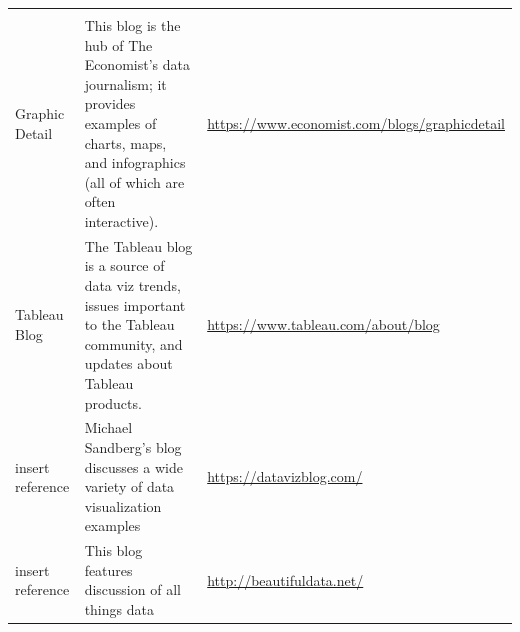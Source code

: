 \documentclass[]{book}
\begin{document}
\begin{longtable}[]{@{}lll@{}}
\begin{minipage}[t]{0.24\columnwidth}
\end{minipage}\tabularnewline
\begin{minipage}[t]{0.24\columnwidth}\raggedright
Graphic Detail\strut
\end{minipage} & \begin{minipage}[t]{0.44\columnwidth}\raggedright
This blog is the hub of The Economist's data journalism; it provides examples of charts, maps, and infographics (all of which are often interactive).\strut
\end{minipage} & \begin{minipage}[t]{0.24\columnwidth}\raggedright
\url{https://www.economist.com/blogs/graphicdetail}\strut
\end{minipage}\tabularnewline
\begin{minipage}[t]{0.24\columnwidth}\raggedright
Tableau Blog\strut
\end{minipage} & \begin{minipage}[t]{0.44\columnwidth}\raggedright
The Tableau blog is a source of data viz trends, issues important to the Tableau community, and updates about Tableau products.\strut
\end{minipage} & \begin{minipage}[t]{0.24\columnwidth}\raggedright
\url{https://www.tableau.com/about/blog}\strut
\end{minipage}\tabularnewline
\begin{minipage}[t]{0.24\columnwidth}\raggedright
insert reference\strut
\end{minipage} & \begin{minipage}[t]{0.44\columnwidth}\raggedright
Michael Sandberg's blog discusses a wide variety of data visualization examples\strut
\end{minipage} & \begin{minipage}[t]{0.24\columnwidth}\raggedright
\url{https://datavizblog.com/}\strut
\end{minipage}\tabularnewline
\begin{minipage}[t]{0.24\columnwidth}\raggedright
insert reference\strut
\end{minipage} & \begin{minipage}[t]{0.44\columnwidth}\raggedright
This blog features discussion of all things data\strut
\end{minipage} & \begin{minipage}[t]{0.24\columnwidth}\raggedright
\url{http://beautifuldata.net/}\strut
\end{minipage}\tabularnewline
\bottomrule
\end{longtable}
\end{document}
